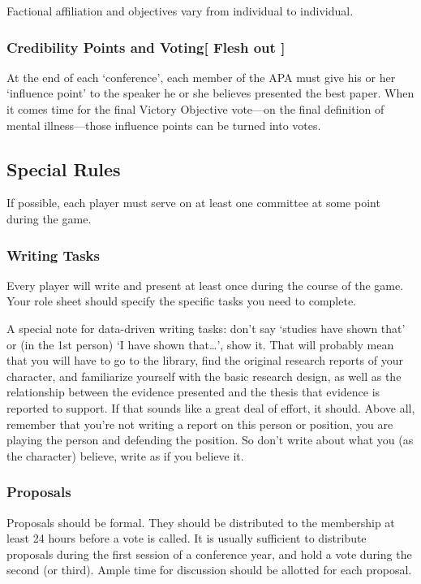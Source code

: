 Factional affiliation and objectives vary from individual to individual.

\subsubsection{Credibility Points and Voting[ Flesh out
]}
\label{credibilitypointsandvoting}

At the end of each `conference', each member of the APA must give his or her `influence point' to the speaker he or she believes presented the best paper. When it comes time for the final Victory Objective vote—on the final definition of mental illness—those influence points can be turned into votes. 

\subsection{Special Rules}
\label{specialrules}

If possible, each player must serve on at least one committee at some point during the game.

\subsubsection{Writing Tasks}
\label{writingtasks}

Every player will write and present at least once during the course of the game. Your role sheet should specify the specific tasks you need to complete.

A special note for data-driven writing tasks: don't say `studies have shown that' or (in the 1st person) `I have shown that{\ldots}', show it. That will probably mean that you will have to go to the library, find the original research reports of your character, and familiarize yourself with the basic research design, as well as the relationship between the evidence presented and the thesis that evidence is reported to support. If that sounds like a great deal of effort, it should. Above all, remember that you're not writing a report on this person or position, you are playing the person and defending the position. So don't write about what you (as the character) believe, write as if you believe it.

\subsubsection{Proposals}
\label{proposals}

Proposals should be formal. They should be distributed to the membership at least 24 hours before a vote is called. It is usually sufficient to distribute proposals during the first session of a conference year, and hold a vote during the second (or third). Ample time for discussion should be allotted for each proposal.

